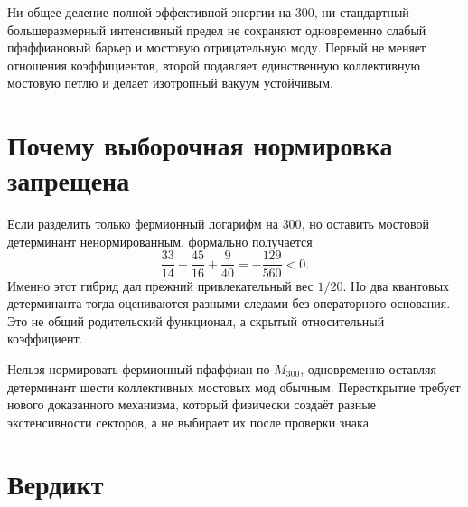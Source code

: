 \begin{theorem}
Ни общее деление полной эффективной энергии на $300$, ни стандартный
большеразмерный интенсивный предел не сохраняют одновременно слабый
пфаффиановый барьер и мостовую отрицательную моду. Первый не меняет
отношения коэффициентов, второй подавляет единственную коллективную
мостовую петлю и делает изотропный вакуум устойчивым.
\end{theorem}

\section{Почему выборочная нормировка запрещена}

Если разделить только фермионный логарифм на $300$, но оставить мостовой
детерминант ненормированным, формально получается
\begin{equation}
 \frac{33}{14}-\frac{45}{16}+\frac9{40}
 =-\frac{129}{560}<0.
\end{equation}
Именно этот гибрид дал прежний привлекательный вес $1/20$. Но два
квантовых детерминанта тогда оцениваются разными следами без
операторного основания. Это не общий родительский функционал, а скрытый
относительный коэффициент.

\begin{nogocriterion}
Нельзя нормировать фермионный пфаффиан по $M_{300}$, одновременно оставляя
детерминант шести коллективных мостовых мод обычным. Переоткрытие требует
нового доказанного механизма, который физически создаёт разные
экстенсивности секторов, а не выбирает их после проверки знака.
\end{nogocriterion}

\section{Вердикт}

